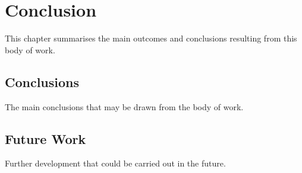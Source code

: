 \chapter{Conclusion}\label{ch:Conclusion}

This chapter summarises the main outcomes and conclusions resulting from this body of work.

\section{Conclusions}

The main conclusions that may be drawn from the body of work.

\section{Future Work}

Further development that could be carried out in the future.
